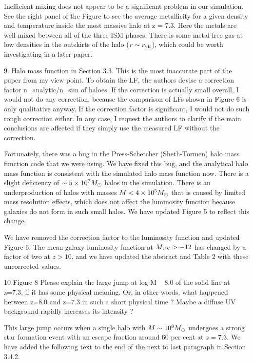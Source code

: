 \documentclass[11pt]{article}
\begin{document}
Inefficient mixing does not appear to be a significant problem in our
simulation.  See the right panel of the Figure to see the average
metallicity for a given density and temperature inside the most
massive halo at z = 7.3.  Here the metals are well mixed between all
of the three ISM phases.  There is some metal-free gas at low
densities in the outskirts of the halo ($r \sim r_{\rm vir}$), which
could be worth investigating in a later paper.

\begin{referee}
9. Halo mass function in Section 3.3.
This is the most inaccurate part of the paper from my
view point. To obtain the LF, the authors devise a correction
factor n_analytic/n_sim of haloes. If the correction is
actually small overall, I would not do any correction, because
the comparison of LFs shown in Figure 6 is only qualitative
anyway. If the correction factor is significant, I would not
do such rough correction either. In any case, I request the
authors to clarify if the main conclusions are affected
if they simply use the measured LF without the correction.
\end{referee}

Fortunately, there was a bug in the Press-Schetcher (Sheth-Tormen)
halo mass function code that we were using.  We have fixed this bug,
and the analytical halo mass function is consistent with the simulated
halo mass function now.  There is a slight deficiency of $\sim 5 \times
10^7 \Ms$ halos in the simulation.  There is an underproduction of
halos with masses $M < 4 \times 10^5 \Ms$ that is caused by limited
mass resolution effects, which does not affect the luminosity function
because galaxies do not form in such small halos.  We have updated
Figure 5 to reflect this change.

We have removed the correction factor to the luminosity function and
updated Figure 6.  The mean galaxy luminosity function at $M_{\rm UV}
> -12$ has changed by a factor of two at $z > 10$, and we have updated
the abstract and Table 2 with these uncorrected values.

\begin{referee}
10 Figure 8
Please explain the large jump at log M ~ 8.0 of the
solid line at z=7.3, if it has some physical meaning.
Or, in other words, what happened between z=8.0
and z=7.3 in such a short physical time ?
Maybe a diffuse UV background rapidly increases
its intensity ?
\end{referee}

This large jump occurs when a single halo with $M \sim 10^8 \Ms$
undergoes a strong star formation event with an escape fraction around
60 per cent at $z = 7.3$.  We have added the following text to the end
of the next to last paragraph in Section 3.4.2.
\end{document}
